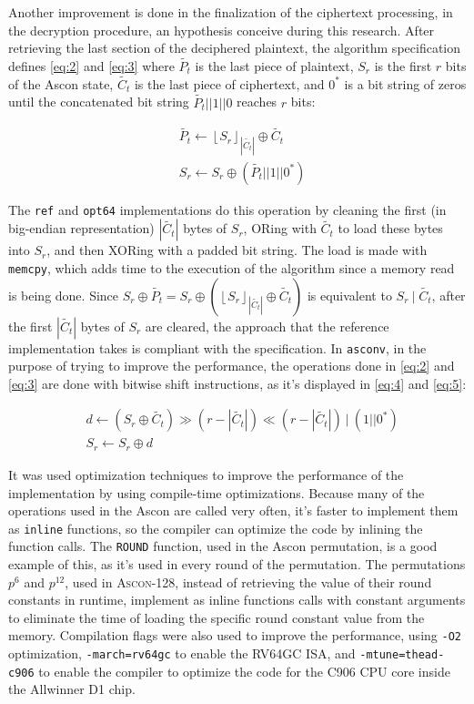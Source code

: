 \documentclass[11pt,twoside]{article}
\begin{document}
Another improvement is done in the finalization of the ciphertext processing, in the decryption procedure, an hypothesis conceive during this research. After retrieving the last section of the deciphered plaintext, the algorithm specification defines \cref{eq:2} and \cref{eq:3} where  $\tilde{P_t}$ is the last piece of plaintext, $S_r$ is the first $r$ bits of the Ascon state, $\tilde{C_t}$ is the last piece of ciphertext, and $0^*$ is a bit string of zeros until the concatenated bit string $\tilde{P_t}||1||0$ reaches $r$ bits:

\begin{align}
   & \tilde{P_{t}} \leftarrow  {\left \lfloor S_{r}  \right \rfloor}_{\left| \tilde{C_{t}} \right|} \oplus \tilde{C_{t}} \label{eq:2} \\
   & S_r \leftarrow S_r \oplus (\tilde{P_{t}} || 1 || 0^{*}) \label{eq:3}
\end{align}

The \texttt{ref} and \texttt{opt64} implementations do this operation by cleaning the first (in big-endian representation) $| \tilde{C_{t}} |$ bytes of $S_r$, ORing with $\tilde{C_t}$ to load these bytes into $S_r$, and then XORing with a padded bit string. The load is made with \texttt{memcpy}, which adds time to the execution of the algorithm since a memory read is being done. Since $S_r \oplus \tilde{P_t} = S_r \oplus  ({\left \lfloor S_{r}  \right \rfloor}_{\left| \tilde{C_{t}} \right|} \oplus \tilde{C_{t}})$ is equivalent to $S_{r} \ | \; \tilde{C_t}$, after the first $| \tilde{C_{t}} |$ bytes of $S_r$ are cleared, the approach that the reference implementation takes is compliant with the specification. In \texttt{asconv}, in the purpose of trying to improve the performance, the operations done in \cref{eq:2} and \cref{eq:3} are done with bitwise shift instructions, as it's displayed in \cref{eq:4} and \cref{eq:5}:

\begin{align}
   & d \leftarrow (S_r \oplus \tilde{C_{t}}) \gg (r - | \tilde{C_{t}}|) \ll (r - | \tilde{C_{t}} |) \ | \ (1||0^*) \label{eq:4} \\
   & S_r \leftarrow S_r \oplus d \label{eq:5}
\end{align}

It was used optimization techniques to improve the performance of the implementation by using compile-time optimizations. Because many of the operations used in the Ascon are called very often, it's faster to implement them as \texttt{inline} functions, so the compiler can optimize the code by inlining the function calls. The \texttt{ROUND} function, used in the Ascon permutation, is a good example of this, as it's used in every round of the permutation. The permutations $p^6$ and $p^{12}$, used in \textsc{Ascon-128}, instead of retrieving the value of their round constants in runtime, implement as inline functions calls with constant arguments to eliminate the time of loading the specific round constant value from the memory. Compilation flags were also used to improve the performance, using \texttt{-O2} optimization, \texttt{-march=rv64gc} to enable the RV64GC ISA, and \texttt{-mtune=thead-c906} to enable the compiler to optimize the code for the C906 CPU core inside the Allwinner D1 chip.
\end{document}
